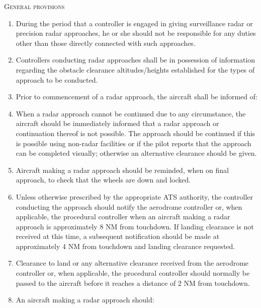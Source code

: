\begin{enumeratesc}
    \item \textsc{General provisions}
    \begin{enumerate}
        \item During the period that a controller is engaged in giving surveillance radar or precision radar approaches, he or she should not be responsible for any duties other than those directly connected with such approaches.
        \item Controllers conducting radar approaches shall be in possession of information regarding the obstacle clearance altitudes/heights established for the types of approach to be conducted.
        \item Prior to commencement of a radar approach, the aircraft shall be informed of:
        

        \item When a radar approach cannot be continued due to any circumstance, the aircraft should be immediately informed that a radar approach or continuation thereof is not possible. The approach should be continued if this is possible using non-radar facilities or if the pilot reports that the approach can be completed visually; otherwise an alternative clearance should be given.
        \item Aircraft making a radar approach should be reminded, when on final approach, to check that the wheels are down and locked.
        \item Unless otherwise prescribed by the appropriate ATS authority, the controller conducting the approach should notify the aerodrome controller or, when applicable, the procedural controller when an aircraft making a radar approach is approximately 8 NM from touchdown. If landing clearance is not received at this time, a subsequent notification should be made at approximately 4 NM from touchdown and landing clearance requested.
        \item Clearance to land or any alternative clearance received from the aerodrome controller or, when applicable, the procedural controller should normally be passed to the aircraft before it reaches a distance of 2 NM from touchdown.
        \item An aircraft making a radar approach should:
        

\end{enumerate}
\end{enumeratesc}
